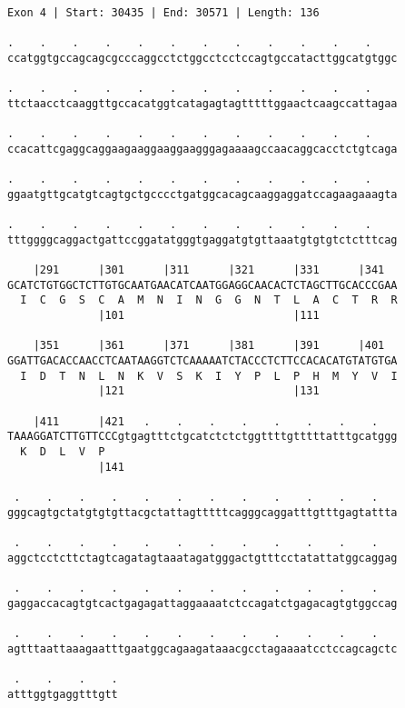 \documentclass{article}
\begin{document}
\begin{Verbatim}[fontfamily=courier]
Exon 4 | Start: 30435 | End: 30571 | Length: 136

.    .    .    .    .    .    .    .    .    .    .    .    
ccatggtgccagcagcgcccaggcctctggcctcctccagtgccatacttggcatgtggc

.    .    .    .    .    .    .    .    .    .    .    .    
ttctaacctcaaggttgccacatggtcatagagtagtttttggaactcaagccattagaa

.    .    .    .    .    .    .    .    .    .    .    .    
ccacattcgaggcaggaagaaggaaggaagggagaaaagccaacaggcacctctgtcaga

.    .    .    .    .    .    .    .    .    .    .    .    
ggaatgttgcatgtcagtgctgcccctgatggcacagcaaggaggatccagaagaaagta

.    .    .    .    .    .    .    .    .    .    .    .    
tttggggcaggactgattccggatatgggtgaggatgtgttaaatgtgtgtctctttcag

    |291      |301      |311      |321      |331      |341  
GCATCTGTGGCTCTTGTGCAATGAACATCAATGGAGGCAACACTCTAGCTTGCACCCGAA
  I  C  G  S  C  A  M  N  I  N  G  G  N  T  L  A  C  T  R  R
              |101                          |111            

    |351      |361      |371      |381      |391      |401  
GGATTGACACCAACCTCAATAAGGTCTCAAAAATCTACCCTCTTCCACACATGTATGTGA
  I  D  T  N  L  N  K  V  S  K  I  Y  P  L  P  H  M  Y  V  I
              |121                          |131            

    |411      |421   .    .    .    .    .    .    .    .   
TAAAGGATCTTGTTCCCgtgagtttctgcatctctctggttttgtttttatttgcatggg
  K  D  L  V  P                                             
              |141                                          

 .    .    .    .    .    .    .    .    .    .    .    .   
gggcagtgctatgtgtgttacgctattagtttttcagggcaggatttgtttgagtattta

 .    .    .    .    .    .    .    .    .    .    .    .   
aggctcctcttctagtcagatagtaaatagatgggactgtttcctatattatggcaggag

 .    .    .    .    .    .    .    .    .    .    .    .   
gaggaccacagtgtcactgagagattaggaaaatctccagatctgagacagtgtggccag

 .    .    .    .    .    .    .    .    .    .    .    .   
agtttaattaaagaatttgaatggcagaagataaacgcctagaaaatcctccagcagctc

 .    .    .    .
atttggtgaggtttgtt
\end{Verbatim}
\newpage
\end{document}
